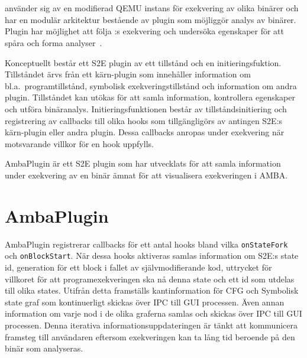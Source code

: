 \section{\stoe{}}

\stoe{} använder sig av en modifierad QEMU instans för exekvering av olika
binärer och har en modulär arkitektur bestående av plugin som möjliggör analys
av binärer. Plugin har möjlighet att följa \stoe{}:s exekvering och undersöka
egenskaper för att spåra och forma analyser~\cite{Chipounov12}.

Konceptuellt består ett S2E plugin av ett tillstånd och en initieringsfuktion.
Tillståndet ärvs från ett kärn-plugin som innehåller information om bl.a.\
programtillstånd, symbolisk exekveringstillstånd och information om andra
plugin. Tillståndet kan utökas för att samla information, kontrollera egenskaper
och utföra binäranalys. Initieringsfunktionen består av tillståndsinitiering och
registrering av callbacks till olika hooks som tillgängligörs av antingen S2E:s
kärn-plugin eller andra plugin. Dessa callbacks anropas under exekvering när
motsvarande villkor för en hook uppfylls.

AmbaPlugin är ett S2E plugin som har utvecklats för att samla information under
exekvering av en binär ämnat för att visualisera exekveringen i AMBA.\@

\section{AmbaPlugin}

AmbaPlugin registrerar callbacks för ett antal hooks bland vilka
\texttt{onStateFork} och \texttt{onBlockStart}. När dessa hooks aktiveras
samlas information om S2E:s state id, generation för ett block i fallet av
självmodifierande kod, uttrycket för villkoret för att programexekveringen ska
nå denna state och ett id som utdelas till olika states. Utifrån detta
framställs kantinformation för CFG och Symbolisk state graf som kontinuerligt
skickas över IPC till GUI processen. Även annan information om varje nod i de
olika graferna samlas och skickas över IPC till GUI processen. Denna iterativa
informationsuppdateringen är tänkt att kommunicera framsteg till användaren
eftersom exekveringen kan ta lång tid beroende på den binär som analyseras.


